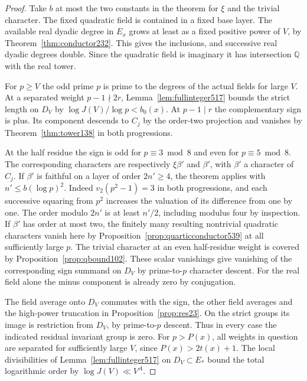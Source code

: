 \documentclass[a4paper,11pt]{article}
\theoremstyle{definition}
\theoremstyle{remark}
\numberwithin{equation}{section}
\begin{document}
\begin{proof}
Take \(b\) at most the two constants in the theorem for
\(\xi\) and the trivial character. The fixed quadratic field
is contained in a fixed base layer. The available real dyadic
degree in \(E_x\) grows at least as a fixed positive power
of \(V\), by Theorem~\ref{thm:conductor232}. This gives the
inclusions, and successive real dyadic degrees double. Since
the quadratic field is imaginary it has intersection
\(\mathbb Q\) with the real tower.

For \(p\ge V\) the odd prime \(p\) is prime to the degrees
of the actual fields for large \(V\). At a separated weight
\(p-1\nmid2r\), Lemma~\ref{lem:fullinteger517} bounds the
strict length on \(D_V\) by \(\log J(V)/\log p<b_0(x)\).
At \(p-1\mid r\) the complementary sign is plus. Its component
descends to \(C_j\) by the order-two projection and vanishes by
Theorem~\ref{thm:tower138} in both progressions.

At the half residue the sign is odd for \(p\equiv3\bmod8\)
and even for \(p\equiv5\bmod8\). The corresponding characters
are respectively \(\xi\beta'\) and \(\beta'\), with \(\beta'\)
a character of \(C_j\). If \(\beta'\) is faithful on a layer
of order \(2n'\ge4\), the theorem applies with
\(n'\le b(\log p)^2\). Indeed \(v_2(p^2-1)=3\) in both
progressions, and each successive squaring from \(p^2\)
increases the valuation of its difference from one by one.
The order modulo \(2n'\) is at least \(n'/2\), including
modulus four by inspection. If \(\beta'\) has order at most
two, the finitely many resulting nontrivial quadratic characters
vanish here by Proposition~\ref{prop:quarticconductor539}
at all sufficiently large \(p\). The trivial character at
an even half-residue weight is covered by
Proposition~\ref{prop:qbound102}. These scalar vanishings give
vanishing of the corresponding sign summand on \(D_V\) by
prime-to-\(p\) character descent. For the real field alone
the minus component is already zero by conjugation.

The field average onto \(D_V\) commutes with the sign, the
other field averages and the high-power truncation in
Proposition~\ref{prop:res23}. On the strict groups its image
is restriction from \(D_V\), by prime-to-\(p\) descent.
Thus in every case the indicated residual invariant group is
zero. For \(p>P(x)\), all weights in question are separated
for sufficiently large \(V\), since \(P(x)>2t(x)+1\).
The local divisibilities of Lemma~\ref{lem:fullinteger517}
on \(D_V\subset E_*\) bound the total logarithmic order by
\(\log J(V)\ll V^A\).
\end{proof}
\end{document}
